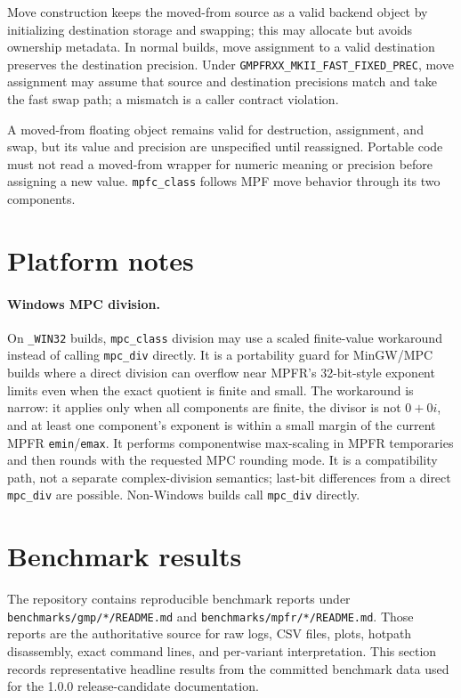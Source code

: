\documentclass[11pt,a4paper]{article}
\newcommand{\code}[1]{\lstinline!#1!}
\begin{document}
Move construction keeps the moved-from source as a valid backend object by
initializing destination storage and swapping; this may allocate but avoids
ownership metadata. In normal builds, move assignment to a valid destination
preserves the destination precision. Under
\code{GMPFRXX_MKII_FAST_FIXED_PREC}, move assignment may assume that source and
destination precisions match and take the fast swap path; a mismatch is a caller
contract violation.

A moved-from floating object remains valid for destruction, assignment, and swap,
but its value and precision are unspecified until reassigned. Portable code must
not read a moved-from wrapper for numeric meaning or precision before assigning a
new value. \code{mpfc_class} follows MPF move behavior through its two
components.

\section{Platform notes}

\paragraph{Windows MPC division.}
On \code{_WIN32} builds, \code{mpc_class} division may use a scaled finite-value
workaround instead of calling \code{mpc_div} directly. It is a portability guard
for MinGW/MPC builds where a direct division can overflow near MPFR's
32-bit-style exponent limits even when the exact quotient is finite and small.
The workaround is narrow: it applies only when all components are finite, the
divisor is not $0+0i$, and at least one component's exponent is within a small
margin of the current MPFR \code{emin}/\code{emax}. It performs componentwise
max-scaling in MPFR temporaries and then rounds with the requested MPC rounding
mode. It is a compatibility path, not a separate complex-division semantics;
last-bit differences from a direct \code{mpc_div} are possible. Non-Windows
builds call \code{mpc_div} directly.


\section{Benchmark results}\label{sec:benchmarks}

The repository contains reproducible benchmark reports under
\code{benchmarks/gmp/*/README.md} and \code{benchmarks/mpfr/*/README.md}. Those
reports are the authoritative source for raw logs, CSV files, plots, hotpath
disassembly, exact command lines, and per-variant interpretation. This section
records representative headline results from the committed benchmark data used
for the 1.0.0 release-candidate documentation.
\end{document}
